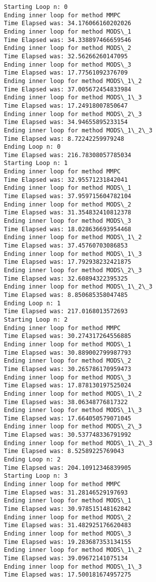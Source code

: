 \documentclass[11pt]{article}
\begin{document}
    \begin{Verbatim}[commandchars=\\\{\}]
Starting Loop n: 0
Ending inner loop for method MMPC 
Time Elapsed was: 34.176066160202026
Ending inner loop for method MODS\_1 
Time Elapsed was: 34.338897466659546
Ending inner loop for method MODS\_2 
Time Elapsed was: 32.56266260147095
Ending inner loop for method MODS\_3 
Time Elapsed was: 17.77561092376709
Ending inner loop for method MODS\_1\_2 
Time Elapsed was: 37.005672454833984
Ending inner loop for method MODS\_1\_3 
Time Elapsed was: 17.24918007850647
Ending inner loop for method MODS\_2\_3 
Time Elapsed was: 34.94655895233154
Ending inner loop for method MODS\_1\_2\_3 
Time Elapsed was: 8.72242259979248
Ending Loop n: 0 
Time Elapsed was: 216.78308057785034
Starting Loop n: 1
Ending inner loop for method MMPC 
Time Elapsed was: 32.95571231842041
Ending inner loop for method MODS\_1 
Time Elapsed was: 37.959715604782104
Ending inner loop for method MODS\_2 
Time Elapsed was: 31.354832410812378
Ending inner loop for method MODS\_3 
Time Elapsed was: 18.028636693954468
Ending inner loop for method MODS\_1\_2 
Time Elapsed was: 37.45760703086853
Ending inner loop for method MODS\_1\_3 
Time Elapsed was: 17.792938232421875
Ending inner loop for method MODS\_2\_3 
Time Elapsed was: 32.60894322395325
Ending inner loop for method MODS\_1\_2\_3 
Time Elapsed was: 8.850685358047485
Ending Loop n: 1 
Time Elapsed was: 217.0168013572693
Starting Loop n: 2
Ending inner loop for method MMPC 
Time Elapsed was: 30.274317264556885
Ending inner loop for method MODS\_1 
Time Elapsed was: 30.889002799987793
Ending inner loop for method MODS\_2 
Time Elapsed was: 30.265786170959473
Ending inner loop for method MODS\_3 
Time Elapsed was: 17.878130197525024
Ending inner loop for method MODS\_1\_2 
Time Elapsed was: 38.06348776817322
Ending inner loop for method MODS\_1\_3 
Time Elapsed was: 17.664050579071045
Ending inner loop for method MODS\_2\_3 
Time Elapsed was: 30.537748336791992
Ending inner loop for method MODS\_1\_2\_3 
Time Elapsed was: 8.52589225769043
Ending Loop n: 2 
Time Elapsed was: 204.10912346839905
Starting Loop n: 3
Ending inner loop for method MMPC 
Time Elapsed was: 31.28146529197693
Ending inner loop for method MODS\_1 
Time Elapsed was: 30.978515148162842
Ending inner loop for method MODS\_2 
Time Elapsed was: 31.482925176620483
Ending inner loop for method MODS\_3 
Time Elapsed was: 19.283687353134155
Ending inner loop for method MODS\_1\_2 
Time Elapsed was: 39.09672141075134
Ending inner loop for method MODS\_1\_3 
Time Elapsed was: 17.500181674957275

\end{Verbatim}
\end{document}
